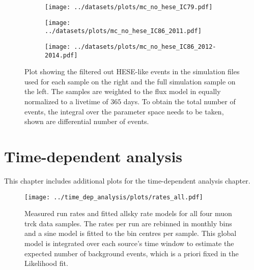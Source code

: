 \begin{figure}[H]
  \centering
  \begin{subfigure}[t]{\textwidth}
    \centering
    \texttt{[image: ../datasets/plots/mc\_no\_hese\_IC79.pdf]}
  \end{subfigure}
  \hfill
  \begin{subfigure}[t]{\textwidth}
    \centering
    \texttt{[image: ../datasets/plots/mc\_no\_hese\_IC86\_2011.pdf]}
  \end{subfigure}
  \hfill
  \begin{subfigure}[t]{\textwidth}
    \centering
    \texttt{[image: ../datasets/plots/mc\_no\_hese\_IC86\_2012-2014.pdf]}
  \end{subfigure}
  \caption[HESE decorrelation for IC79, IC86'11, IC86'12--'14]{
    Plot showing the filtered out HESE-like events in the simulation files used for each sample on the right and the full simulation sample on the left.
    The samples are weighted to the flux model in \cite{Haack:2017dxi} equally normalized to a livetime of $365$ days.
    To obtain the total number of events, the integral over the parameter space needs to be taken, shown are differential number of events.
    }
  \label{fig:mc_no_hese_79_86I_86II}
\end{figure}


\section{Time-dependent analysis}
This chapter includes additional plots for the time-dependent analysis chapter.

\begin{figure}[H]
  \centering
  \texttt{[image: ../time\_dep\_analysis/plots/rates\_all.pdf]}
  \caption[Total run rates and sine models for all samples]{
    Measured run rates and fitted allsky rate models for all four muon trck data samples.
    The rates per run are rebinned in monthly bins and a sine model is fitted to the bin centres per sample.
    This global model is integrated over each source's time window to estimate the expected number of background events, which is a priori fixed in the Likelihood fit.
  }
  \label{fig:rates_all}
\end{figure}


